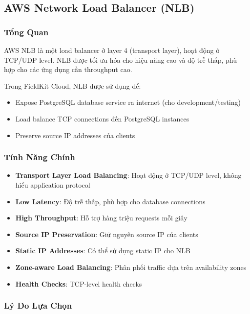 \subsection{AWS Network Load Balancer (NLB)}

\subsubsection{Tổng Quan}

AWS NLB là một load balancer ở layer 4 (transport layer), hoạt động ở TCP/UDP level. NLB được tối ưu hóa cho hiệu năng cao và độ trễ thấp, phù hợp cho các ứng dụng cần throughput cao.

Trong FieldKit Cloud, NLB được sử dụng để:
\begin{itemize}
    \item Expose PostgreSQL database service ra internet (cho development/testing)
    \item Load balance TCP connections đến PostgreSQL instances
    \item Preserve source IP addresses của clients
\end{itemize}

\subsubsection{Tính Năng Chính}

\begin{itemize}
    \item \textbf{Transport Layer Load Balancing}: Hoạt động ở TCP/UDP level, không hiểu application protocol
    \item \textbf{Low Latency}: Độ trễ thấp, phù hợp cho database connections
    \item \textbf{High Throughput}: Hỗ trợ hàng triệu requests mỗi giây
    \item \textbf{Source IP Preservation}: Giữ nguyên source IP của clients
    \item \textbf{Static IP Addresses}: Có thể sử dụng static IP cho NLB
    \item \textbf{Zone-aware Load Balancing}: Phân phối traffic dựa trên availability zones
    \item \textbf{Health Checks}: TCP-level health checks
\end{itemize}

\subsubsection{Lý Do Lựa Chọn}

